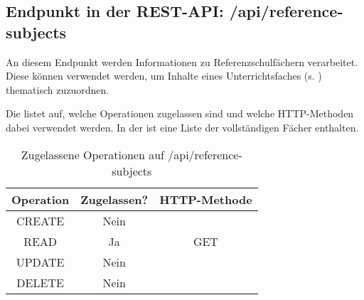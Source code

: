 \subsection{Endpunkt in der REST-API: /api/reference-subjects}
\label{sec:end:rest:api:reference-subjects}
An diesem Endpunkt werden Informationen zu Referenzschulfächern verarbeitet. Diese können verwendet werden, um Inhalte eines Unterrichtsfaches (s. ) thematisch zuzuordnen.

Die  listet auf, welche Operationen zugelassen sind und welche HTTP-Methoden dabei verwendet werden. 
In der  ist eine Liste der vollständigen Fächer enthalten.


\begin{table}[!htbp]
	\begin{tabular}{|c|c|c|}
		\hline
			\textbf{Operation} & \textbf{Zugelassen?} & \textbf{HTTP-Methode} \\ \hline
			CREATE & Nein & \\ \hline 
			READ & Ja & GET \\ \hline
			UPDATE & Nein & \\ \hline 
			DELETE & Nein & \\ \hline
	\end{tabular}

		\caption{Zugelassene Operationen auf /api/reference-subjects}
		\label{tab:end:rest:api:reference-subjects:meth}
\end{table}